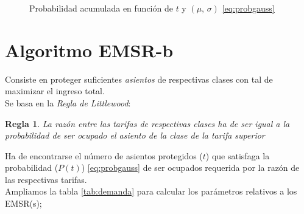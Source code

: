 \documentclass[12pt]{article}
\newtheorem{regla}{Regla}
\begin{document}
\begin{figure}
\centering
{}
\caption{Probabilidad acumulada en función de $t$ y $(\mu , \, \sigma)$ \eqref{eq:probgauss}}\label{fig:cdf}
\end{figure}



\section{Algoritmo EMSR-b}

Consiste en proteger suficientes \emph{asientos} de respectivas clases con tal de maximizar el ingreso total.\\

Se basa en la \emph{Regla de Littlewood}:

\begin{regla}
La razón entre las tarifas de respectivas clases ha de ser igual a la probabilidad de ser ocupado el asiento de la clase de la tarifa superior
\end{regla}


Ha de encontrarse el número de asientos protegidos ($t$) que satisfaga la probabilidad ($P(t)$) \eqref{eq:probgauss} de ser ocupados requerida por la razón de las respectivas tarifas.\\

Ampliamos la tabla \ref{tab:demanda} para calcular los parámetros relativos a los EMSR(s); \cite{wiki:emsr, yt:emsrb}\\
\end{document}

